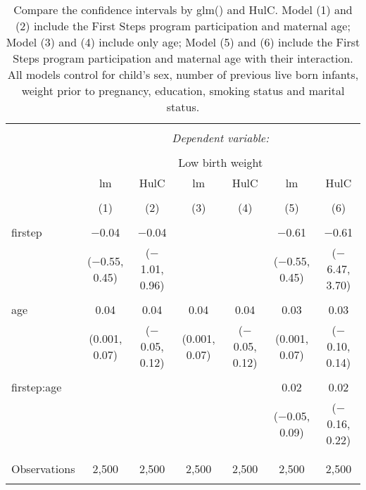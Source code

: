 
\begin{table}[!htbp] \centering 
  \caption{Compare the confidence intervals by glm() and HulC. Model (1) and (2) include the First Steps program participation and maternal age; Model (3) and (4) include only age; Model (5) and (6) include the First Steps program participation and maternal age with their interaction. All models control for child’s sex, number of previous live born infants, weight prior to pregnancy, education, smoking status and marital status.} 
  \label{tbl:glm-ci} 
\begin{tabular}{@{\extracolsep{-10pt}}lcccccc} 
\\[-1.8ex]\hline 
\hline \\[-1.8ex] 
 & \multicolumn{6}{c}{\textit{Dependent variable:}} \\ 
\cline{2-7} 
\\[-1.8ex] & \multicolumn{6}{c}{Low birth weight} \\ 
 & lm & HulC & lm & HulC & lm & HulC \\ 
\\[-1.8ex] & (1) & (2) & (3) & (4) & (5) & (6)\\ 
\hline \\[-1.8ex] 
 firstep & $-$0.04 & $-$0.04 &  &  & $-$0.61 & $-$0.61 \\ 
  & ($-$0.55, 0.45) & ($-$1.01, 0.96) &  &  & ($-$0.55, 0.45) & ($-$6.47, 3.70) \\ 
  & & & & & & \\ 
 age & 0.04 & 0.04 & 0.04 & 0.04 & 0.03 & 0.03 \\ 
  & (0.001, 0.07) & ($-$0.05, 0.12) & (0.001, 0.07) & ($-$0.05, 0.12) & (0.001, 0.07) & ($-$0.10, 0.14) \\ 
  & & & & & & \\ 
 firstep:age &  &  &  &  & 0.02 & 0.02 \\ 
  &  &  &  &  & ($-$0.05, 0.09) & ($-$0.16, 0.22) \\ 
  & & & & & & \\ 
\hline \\[-1.8ex] 
Observations & 2,500 & 2,500 & 2,500 & 2,500 & 2,500 & 2,500 \\ 
\hline 
\hline \\[-1.8ex] 
\end{tabular} 
\end{table} 
